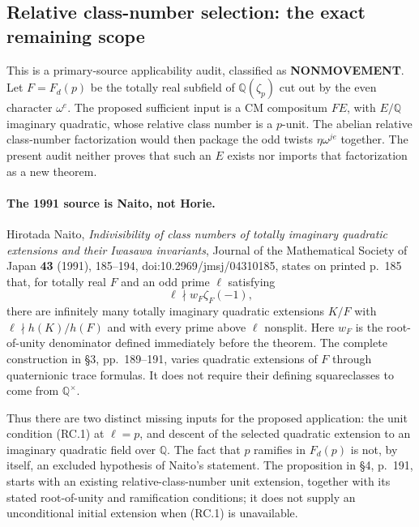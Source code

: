 \subsection{Relative class-number selection: the exact remaining scope}
\label{KT-RELATIVE-CLASS-SELECTION-SCOPE}

This is a primary-source applicability audit, classified as
\textbf{NONMOVEMENT}.  Let $F=F_d(p)$ be the totally real subfield of
$\mathbb Q(\zeta_p)$ cut out by the even character $\omega^e$.
The proposed sufficient input is a CM compositum $FE$, with $E/\mathbb Q$
imaginary quadratic, whose relative class number is a $p$-unit.
The abelian relative class-number factorization would then package the
odd twists $\eta\omega^{je}$ together.  The present audit neither proves
that such an $E$ exists nor imports that factorization as a new theorem.

\paragraph{The 1991 source is Naito, not Horie.}
Hirotada Naito, \emph{Indivisibility of class numbers of totally imaginary
quadratic extensions and their Iwasawa invariants}, Journal of the
Mathematical Society of Japan \textbf{43} (1991), 185--194,
doi:10.2969/jmsj/04310185, states on printed p.~185 that, for totally real
$F$ and an odd prime $\ell$ satisfying
\[
             \ell\nmid w_F\zeta_F(-1),                 \tag{RC.1}
\]
there are infinitely many totally imaginary quadratic extensions $K/F$
with $\ell\nmid h(K)/h(F)$ and with every prime above $\ell$ nonsplit.
Here $w_F$ is the root-of-unity denominator defined immediately before
the theorem.  The complete construction in \S3, pp.~189--191, varies
quadratic extensions of $F$ through quaternionic trace formulas.  It
does not require their defining squareclasses to come from
$\mathbb Q^\times$.

Thus there are two distinct missing inputs for the proposed application:
the unit condition (RC.1) at $\ell=p$, and descent of the selected
quadratic extension to an imaginary quadratic field over $\mathbb Q$.
The fact that $p$ ramifies in $F_d(p)$ is not, by itself, an excluded
hypothesis of Naito's statement.  The proposition in \S4, p.~191,
starts with an existing relative-class-number unit extension, together
with its stated root-of-unity and ramification conditions; it does not
supply an unconditional initial extension when (RC.1) is unavailable.

